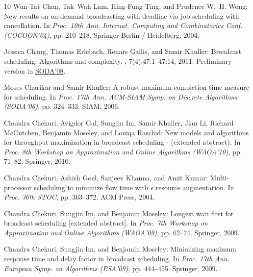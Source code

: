 \begin{thebibliography}{10}
{\sc Wun-Tat Chan, Tak~Wah Lam, Hing-Fung Ting, and Prudence W.~H. Wong}: New
  results on on-demand broadcasting with deadline via job scheduling with
  cancellation.
\newblock In {\em Proc. 10th Ann. Internat. Computing and Combinatorics Conf.
  (COCOON'04)}, pp. 210--218. Springer Berlin / Heidelberg, 2004.
\newblock [\epfmtdoi{10.1007/978-3-540-27798-9\_24}]

{\sc Jessica Chang, Thomas Erlebach, Renars Gailis, and Samir Khuller}:
  Broadcast scheduling: Algorithms and complexity.
, 7(4):47:1--47:14, 2011.
\newblock Preliminary version in
  \href{https://dl.acm.org/citation.cfm?doid=1347082.1347134}{SODA'08}.
\newblock [\epfmtdoi{10.1145/2000807.2000815}]

{\sc Moses Charikar and Samir Khuller}: A robust maximum completion time
  measure for scheduling.
\newblock In {\em Proc. 17th Ann. ACM-SIAM Symp. on Discrete Algorithms
  (SODA'06)}, pp. 324--333. SIAM, 2006.
\newblock [\epfmtdoi{10.1145/1109557.1109594}]

{\sc Chandra Chekuri, Avigdor Gal, Sungjin Im, Samir Khuller, Jian Li, Richard
  McCutchen, Benjamin Moseley, and Louiqa Raschid}: New models and algorithms
  for throughput maximization in broadcast scheduling - (extended abstract).
\newblock In {\em Proc. 8th Workshop on Approximation and Online Algorithms
  (WAOA'10)}, pp. 71--82. Springer, 2010.
\newblock [\epfmtdoi{10.1007/978-3-642-18318-8\_7}]

{\sc Chandra Chekuri, Ashish Goel, Sanjeev Khanna, and Amit Kumar}:
  Multi-processor scheduling to minimize flow time with $\epsilon$ resource
  augmentation.
\newblock In {\em Proc. 36th STOC}, pp. 363--372. ACM Press, 2004.
\newblock [\epfmtdoi{10.1145/1007352.1007411}]

{\sc Chandra Chekuri, Sungjin Im, and Benjamin Moseley}: Longest wait first for
  broadcast scheduling [extended abstract].
\newblock In {\em Proc. 7th Workshop on Approximation and Online Algorithms
  (WAOA'09)}, pp. 62--74. Springer, 2009.
\newblock [\epfmtdoi{10.1007/978-3-642-12450-1\_6}]

{\sc Chandra Chekuri, Sungjin Im, and Benjamin Moseley}: Minimizing maximum
  response time and delay factor in broadcast scheduling.
\newblock In {\em Proc. 17th Ann. European Symp. on Algorithms (ESA'09)}, pp.
  444--455. Springer, 2009.
\newblock [\epfmtdoi{10.1007/978-3-642-04128-0\_40}]


\end{thebibliography}
